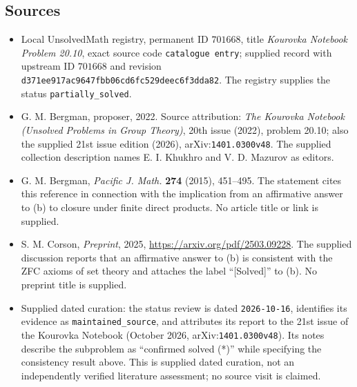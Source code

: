 \documentclass[11pt]{article}
\begin{document}
\subsection{Sources}
\begin{itemize}
\item Local UnsolvedMath registry, permanent ID \(701668\), title \emph{Kourovka Notebook Problem 20.10}, exact source code \texttt{catalogue entry}; supplied record with upstream ID \(701668\) and revision \texttt{d371ee917ac9647fbb06cd6fc529deec6f3dda82}. The registry supplies the status \texttt{partially\_solved}.
\item G. M. Bergman, proposer, 2022. Source attribution: \emph{The Kourovka Notebook (Unsolved Problems in Group Theory)}, 20th issue (2022), problem 20.10; also the supplied 21st issue edition (2026), arXiv:\texttt{1401.0300v48}. The supplied collection description names E. I. Khukhro and V. D. Mazurov as editors.
\item G. M. Bergman, \emph{Pacific J. Math.} \textbf{274} (2015), 451--495. The statement cites this reference in connection with the implication from an affirmative answer to (b) to closure under finite direct products. No article title or link is supplied.
\item S. M. Corson, \emph{Preprint}, 2025, \url{https://arxiv.org/pdf/2503.09228}. The supplied discussion reports that an affirmative answer to (b) is consistent with the ZFC axioms of set theory and attaches the label ``[Solved]'' to (b). No preprint title is supplied.
\item Supplied dated curation: the status review is dated \texttt{2026-10-16}, identifies its evidence as \texttt{maintained\_source}, and attributes its report to the 21st issue of the Kourovka Notebook (October 2026, arXiv:\texttt{1401.0300v48}). Its notes describe the subproblem as ``confirmed solved (*)'' while specifying the consistency result above. This is supplied dated curation, not an independently verified literature assessment; no source visit is claimed.
\end{itemize}
\end{document}
